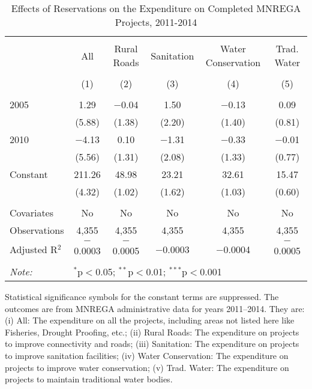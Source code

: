 \begin{table}[!htbp]
\centering
\begin{threeparttable}

  \caption{Effects of Reservations on the Expenditure on Completed MNREGA Projects, 2011-2014} 
  \label{main_mnrega_expenditure} 
\scriptsize 
\begin{tabular}{@{\extracolsep{0pt}}lccccc} 
\\[-1.8ex]\hline 
\hline \\[-1.8ex] 
 & All & Rural Roads & Sanitation & Water Conservation & Trad. Water \\ 
\\[-1.8ex] & (1) & (2) & (3) & (4) & (5)\\ 
\hline \\[-1.8ex] 
 2005 & 1.29 & $-$0.04 & 1.50 & $-$0.13 & 0.09 \\ 
  & (5.88) & (1.38) & (2.20) & (1.40) & (0.81) \\ 
  2010 & $-$4.13 & 0.10 & $-$1.31 & $-$0.33 & $-$0.01 \\ 
  & (5.56) & (1.31) & (2.08) & (1.33) & (0.77) \\ 
  Constant & 211.26 & 48.98 & 23.21 & 32.61 & 15.47 \\ 
  & (4.32) & (1.02) & (1.62) & (1.03) & (0.60) \\ 
 \hline \\[-1.8ex] 
Covariates & No & No & No & No & No \\ 
Observations & 4,355 & 4,355 & 4,355 & 4,355 & 4,355 \\ 
Adjusted R$^{2}$ & $-$0.0003 & $-$0.0005 & $-$0.0003 & $-$0.0004 & $-$0.0005 \\ 
\hline 
\hline \\[-1.8ex] 
\textit{Note:}  & \multicolumn{5}{l}{$^{*}$p$<$0.05; $^{**}$p$<$0.01; $^{***}$p$<$0.001} \\ 
\end{tabular} 
\begin{tablenotes}[flushleft]
\scriptsize
\item[] Statistical significance symbols for the constant terms are suppressed. The outcomes are from MNREGA administrative data for years 2011--2014. They are: 
                     (i) All: The expenditure on all the projects, including areas not listed here like Fisheries, Drought Proofing, etc.;
                     (ii) Rural Roads: The expenditure on projects to improve connectivity and roads;
                     (iii) Sanitation: The expenditure on projects to improve sanitation facilities;
                     (iv) Water Conservation: The expenditure on projects to improve water conservation;
                     (v) Trad. Water: The expenditure on projects to maintain traditional water bodies.
\end{tablenotes}
\end{threeparttable}
\end{table}
